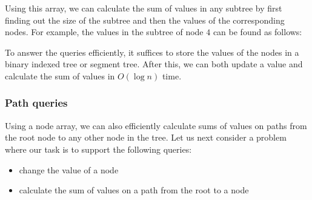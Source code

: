 Using this array, we can calculate the sum of values
in any subtree by first finding out the size of the subtree
and then the values of the corresponding nodes.
For example, the values in the subtree of node $4$
can be found as follows:

\begin{center}
\end{center}

To answer the queries efficiently,
it suffices to store the values of the
nodes in a binary indexed tree or segment tree.
After this, we can both update a value
and calculate the sum of values in $O(\log n)$ time.

\subsubsection{Path queries}

Using a node array, we can also efficiently
calculate sums of values on
paths from the root node to any other
node in the tree.
Let us next consider a problem where our task
is to support the following queries:
\begin{itemize}
\item change the value of a node
\item calculate the sum of values on a path from
the root to a node
\end{itemize}

